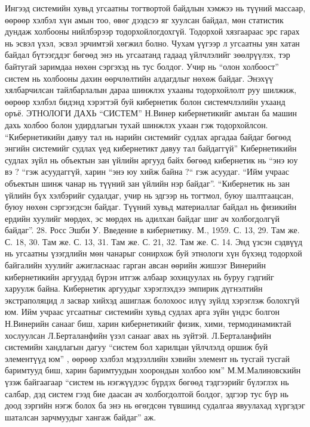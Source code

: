 Ингээд системийн хувьд угсаатны тогтвортой байдлын хэмжээ нь түүний массаар, өөрөөр хэлбэл хүн амын тоо, өвөг дээдсээ яг хуулсан байдал, мөн статистик дундаж холбооны нийлбэрээр тодорхойлогдохгүй. Тодорхой хязгаараас эрс гарах нь эсвэл үхэл, эсвэл эрчимтэй хөгжил болно. Чухам үүгээр л угсаатны уян хатан байдал бүтээгддэг бөгөөд энэ нь угсаатанд гадаад үйлчлэлийг зөөлрүүлэх, тэр байтугай заримдаа нөхөн сэргэхэд нь тус болдог. Учир нь “олон холбоост” систем нь холбооны дахин өөрчлөлтийн алдагдлыг нөхөж байдаг.
Энэхүү хялбарчилсан тайлбарлалын дараа шинжлэх ухааны тодорхойлолт руу шилжиж, өөрөөр хэлбэл бидэнд хэрэгтэй буй кибернетик болон системчлэлийн ухаанд оръё.
ЭТНОЛОГИ ДАХЬ “СИСТЕМ”
Н.Винер кибернетикийг амьтан ба машин дахь холбоо болон удирдлагын тухай шинжлэх ухаан гэж тодорхойлсон. “Кибернетикийн давуу тал нь нарийн системийг судлах аргадаа байдаг бөгөөд энгийн системийг судлах үед кибернетикт давуу тал байдаггүй” Кибернетикийн судлах зүйл нь объектын зан үйлийн аргууд байх бөгөөд кибернетик нь “энэ юу вэ ? “гэж асуудаггүй, харин “энэ юу хийж байна ?“ гэж асуудаг. “Ийм учраас объектын шинж чанар нь түүний зан үйлийн нэр байдаг”. “Кибернетик нь зан үйлийн бүх хэлбэрийг судалдаг, учир нь эдгээр нь тогтмол, буюу шалтгаацсан, буюу нөхөн сэргээгдсэн байдаг. Түүний хувьд материаллаг байдал нь физикийн ердийн хуулийг мөрдөх, эс мөрдөх нь адилхан байдаг шиг ач холбогдолгүй байдаг”. 28. Росс Эшби У. Введение в кибернетику. М., 1959. С. 13, 29. Там же. С. 18, 30. Там же. С. 13, 31. Там же. С. 21, 32. Там же. С. 14.
Энд үзсэн сэдвүүд нь угсаатны үзэгдлийн мөн чанарыг сонирхож буй этнологи хүн бүхэнд тодорхой байгалийн хуулийг ажигласнаас гарган авсан өөрийн жишээг Винерийн кибернетикийн аргуудад бүрэн итгэж албаар зохицуулах нь буруу гэдгийг харуулж байна. Кибернетик аргуудыг хэрэглэхдээ эмпирик дүгнэлтийн экстраполяцид л засвар хийхэд ашиглаж болохоос илүү зүйлд хэрэглэж болохгүй юм. Ийм учраас угсаатныг системийн хувьд судлах арга зүйн үндэс болгон Н.Винерийн санааг биш, харин кибернетикийг физик, хими, термодинамиктай хослуулсан Л.Берталанфийн үзэл санааг авах нь зүйтэй.
Л.Берталанфийн системийн хандлагын дагуу “систем бол харилцан үйлчлэлд оршиж буй элементүүд юм” , өөрөөр хэлбэл мэдээллийн хэвийн элемент нь тусгай тусгай баримтууд биш, харин баримтуудын хоорондын холбоо юм” М.М.Малиновскийн үзэж байгаагаар “систем нь нэгжүүдээс бүрдэх бөгөөд тэдгээрийг бүлэглэх нь салбар, дэд систем гээд бие даасан ач холбогдолтой болдог, эдгээр тус бүр нь доод зэргийн нэгж болох ба энэ нь өгөгдсөн түвшинд судалгаа явуулахад хүргэдэг шаталсан зарчмуудыг хангаж байдаг” аж.
